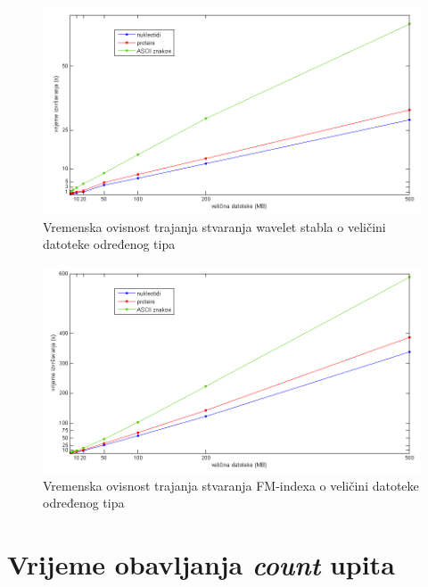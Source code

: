 \begin{figure}[H]
   \centering
       \includegraphics[width=\textwidth]{./pictures/test_wavelet.png}
 \caption{Vremenska ovisnost trajanja stvaranja wavelet stabla o veličini datoteke određenog tipa}
 \label{fig:test_wavelet}
\end{figure}

\begin{figure}[H]
   \centering
       \includegraphics[width=\textwidth]{./pictures/test_fm.png}
 \caption{Vremenska ovisnost trajanja stvaranja FM-indexa o veličini datoteke određenog tipa}
 \label{fig:test_fm}
\end{figure}




\section{Vrijeme obavljanja \textit{count} upita}


